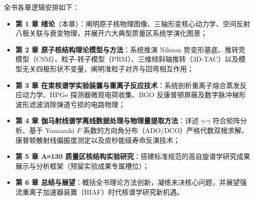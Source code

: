 全书各章逻辑安排如下：
\begin{itemize}
    \item \textbf{第 1 章 绪论}（本章）：阐明原子核物理图像、三轴形变核心动力学、空间反射八极关联与衰变物理，并展开六大典型质量区系统学演化图景；
    \item \textbf{第 2 章 原子核结构理论模型与方法}：系统推演 Nilsson 势变形基底、推转壳模型（CSM）、粒子-转子模型（PRM）、三维倾斜轴推转（3D-TAC）以及模型无关四极形状不变量，阐明准粒子对齐与回弯相互作用；
    \item \textbf{第 3 章 在束核谱学实验装置与重离子反应技术}：系统剖析重离子熔合蒸发反应动力学、HPGe 探测器微观电荷收集、BGO 反康普顿屏蔽及数字脉冲梯形波形滤波消除弹道亏损的电路物理；
    \item \textbf{第 4 章 伽马射线谱学离线数据处理与物理量提取方法}：详述 $\gamma$-$\gamma$ 符合矩阵分析、基于 Yamazaki $F$ 系数的方向角分布（ADO/DCO）严格代数双根求解、康普顿散射线偏振度测定以及皮秒能级寿命反演技术；
    \item \textbf{第 5 章 A≈130 质量区核结构实验研究}：搭建标准规范的高自旋谱学研究成果展示与分析框架（预留实验成果专属槽位）；
    \item \textbf{第 6 章 总结与展望}：概括全书理论方法创新，凝练未决核心问题，并展望强流重离子加速器装置（HIAF）时代核谱学研究新机遇。
\end{itemize}
